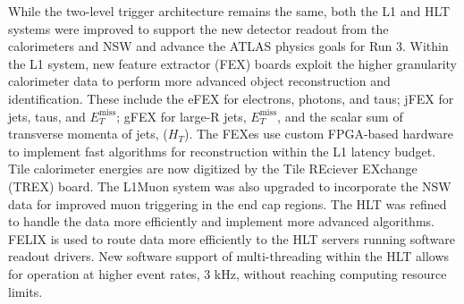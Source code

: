 While the two-level trigger architecture remains the same, both the L1 and HLT systems were improved to support the new detector readout from the calorimeters and NSW and advance the ATLAS physics goals for Run 3.
Within the L1 system, new feature extractor (FEX) boards exploit the higher granularity calorimeter data to perform more advanced object reconstruction and identification.
These include the eFEX for electrons, photons, and taus; jFEX for jets, taus, and $E_T^{\text{miss}}$; gFEX for large-R jets, $E_T^{\text{miss}}$, and the scalar sum of transverse momenta of jets, ($H_T$).
The FEXes use custom FPGA-based hardware to implement fast algorithms for reconstruction within the L1 latency budget.
Tile calorimeter energies are now digitized by the Tile REciever EXchange (TREX) board.
The L1Muon system was also upgraded to incorporate the NSW data for improved muon triggering in the end cap regions.
The HLT was refined to handle the data more efficiently and implement more advanced algorithms.
FELIX is used to route data more efficiently to the HLT servers running software readout drivers. 
New software support of multi-threading within the HLT allows for operation at higher event rates, 3 kHz, without reaching computing resource limits.